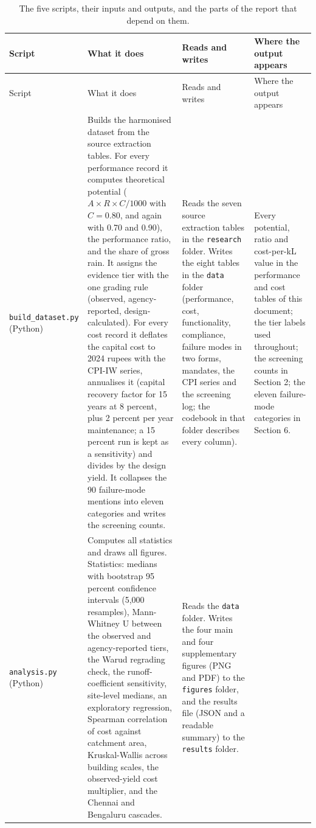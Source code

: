 \begin{longtable}{@{}>{\raggedright\arraybackslash}p{2.9cm}>{\raggedright\arraybackslash}p{4.7cm}>{\raggedright\arraybackslash}p{4.2cm}>{\raggedright\arraybackslash}p{4.3cm}@{}}
\caption{The five scripts, their inputs and outputs, and the parts of the report that depend on them.}\\
\toprule
Script & What it does & Reads and writes & Where the output appears \\
\midrule
\endfirsthead
\toprule
Script & What it does & Reads and writes & Where the output appears \\
\midrule
\endhead
\bottomrule
\endfoot
\texttt{build\_\allowbreak dataset.py} (Python) &
Builds the harmonised dataset from the source extraction tables. For every performance record it computes theoretical potential ($A \times R \times C/1000$ with $C = 0.80$, and again with 0.70 and 0.90), the performance ratio, and the share of gross rain. It assigns the evidence tier with the one grading rule (observed, agency-reported, design-calculated). For every cost record it deflates the capital cost to 2024 rupees with the CPI-IW series, annualises it (capital recovery factor for 15 years at 8 percent, plus 2 percent per year maintenance; a 15 percent run is kept as a sensitivity) and divides by the design yield. It collapses the 90 failure-mode mentions into eleven categories and writes the screening counts. &
Reads the seven source extraction tables in the \texttt{research} folder. Writes the eight tables in the \texttt{data} folder (performance, cost, functionality, compliance, failure modes in two forms, mandates, the CPI series and the screening log; the codebook in that folder describes every column). &
Every potential, ratio and cost-per-kL value in the performance and cost tables of this document; the tier labels used throughout; the screening counts in Section 2; the eleven failure-mode categories in Section 6. \\
\addlinespace
\texttt{analysis.py} (Python) &
Computes all statistics and draws all figures. Statistics: medians with bootstrap 95 percent confidence intervals (5,000 resamples), Mann-Whitney U between the observed and agency-reported tiers, the Warud regrading check, the runoff-coefficient sensitivity, site-level medians, an exploratory regression, Spearman correlation of cost against catchment area, Kruskal-Wallis across building scales, the observed-yield cost multiplier, and the Chennai and Bengaluru cascades. &
Reads the \texttt{data} folder. Writes the four main and four supplementary figures (PNG and PDF) to the \texttt{figures} folder, and the results file (JSON and a readable summary) to the \texttt{results} folder. &

\end{longtable}

